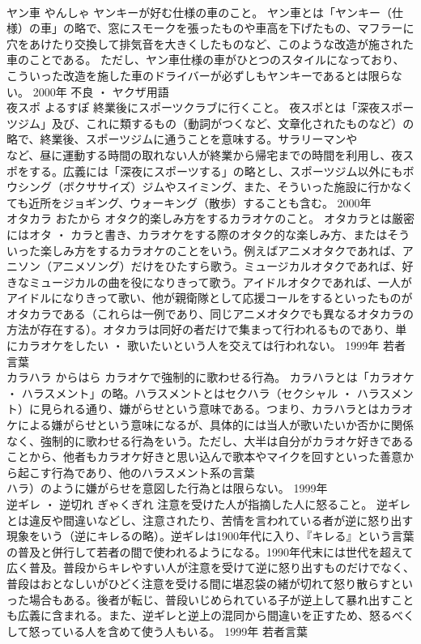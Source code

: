 \documentclass[8pt]{extreport}
\begin{document}
\begin{CJK}{UTF8}{min}
\\	ヤン車	やんしゃ	ヤンキーが好む仕様の車のこと。	ヤン車とは「ヤンキー（仕様）の車」の略で、窓にスモークを張ったものや車高を下げたもの、マフラーに穴をあけたり交換して排気音を大きくしたものなど、このような改造が施された車のことである。 ただし、ヤン車仕様の車がひとつのスタイルになっており、こういった改造を施した車のドライバーが必ずしもヤンキーであるとは限らない。	2000年	不良 ・ ヤクザ用語	
\\	夜スポ	よるすぽ	終業後にスポーツクラブに行くこと。	夜スポとは「深夜スポーツジム」及び、これに類するもの（動詞がつくなど、文章化されたものなど）の略で、終業後、スポーツジムに通うことを意味する。サラリーマンや
\\	など、昼に運動する時間の取れない人が終業から帰宅までの時間を利用し、夜スポをする。広義には「深夜にスポーツする」の略とし、スポーツジム以外にもボウシング（ボクササイズ）ジムやスイミング、また、そういった施設に行かなくても近所をジョギング、ウォーキング（散歩）することも含む。	2000年	
\\	オタカラ	おたから	オタク的楽しみ方をするカラオケのこと。	オタカラとは厳密にはオタ ・ カラと書き、カラオケをする際のオタク的な楽しみ方、またはそういった楽しみ方をするカラオケのことをいう。例えばアニメオタクであれば、アニソン（アニメソング）だけをひたすら歌う。ミュージカルオタクであれば、好きなミュージカルの曲を役になりきって歌う。アイドルオタクであれば、一人がアイドルになりきって歌い、他が親衛隊として応援コールをするといったものがオタカラである（これらは一例であり、同じアニメオタクでも異なるオタカラの方法が存在する）。オタカラは同好の者だけで集まって行われるものであり、単にカラオケをしたい ・ 歌いたいという人を交えては行われない。	1999年	若者言葉	
\\	カラハラ	からはら	カラオケで強制的に歌わせる行為。	カラハラとは「カラオケ ・ ハラスメント」の略。ハラスメントとはセクハラ（セクシャル ・ ハラスメント）に見られる通り、嫌がらせという意味である。つまり、カラハラとはカラオケによる嫌がらせという意味になるが、具体的には当人が歌いたいか否かに関係なく、強制的に歌わせる行為をいう。ただし、大半は自分がカラオケ好きであることから、他者もカラオケ好きと思い込んで歌本やマイクを回すといった善意から起こす行為であり、他のハラスメント系の言葉
\\	ハラ）のように嫌がらせを意図した行為とは限らない。	1999年	
\\	逆ギレ ・ 逆切れ	ぎゃくぎれ	注意を受けた人が指摘した人に怒ること。	逆ギレとは違反や間違いなどし、注意されたり、苦情を言われている者が逆に怒り出す現象をいう（逆にキレるの略）。逆ギレは1900年代に入り、『キレる』という言葉の普及と併行して若者の間で使われるようになる。1990年代末には世代を超えて広く普及。普段からキレやすい人が注意を受けて逆に怒り出すものだけでなく、普段はおとなしいがひどく注意を受ける間に堪忍袋の緒が切れて怒り散らすといった場合もある。後者が転じ、普段いじめられている子が逆上して暴れ出すことも広義に含まれる。また、逆ギレと逆上の混同から間違いを正すため、怒るべくして怒っている人を含めて使う人もいる。	1999年	若者言葉	

\end{CJK}
\end{document}
